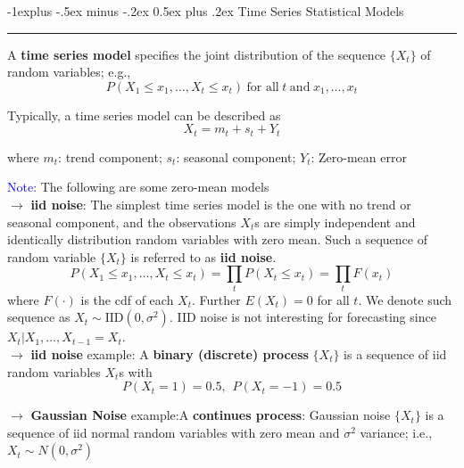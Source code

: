 \documentclass[letterpaper, 10.5pt,landscape]{article}
\makeatletter
\renewcommand{\subsection}{\@startsection{subsection}{2}{0mm}%
                                {-1explus -.5ex minus -.2ex}%
                                {0.5ex plus .2ex}%
                                {\normalfont\normalsize\bfseries}}
\makeatother
\begin{document}
\begin{multicols*}{3}
\subsection{Time Series Statistical Models} {\color{teal}\hrule height 0.5pt} \smallskip

A \textbf{time series model} specifies the joint distribution of the sequence $\{X_{t} \}$ of random variables; e.g., 
\vspace{-3pt}
\[P\left(X_{1} \leq x_{1}, \ldots, X_{t} \leq x_{t}\right) \hspace{3pt} \text{for all} \hspace{3pt} t \hspace{3pt} \text{and} \hspace{3pt} x_{1},\ldots, x_{t} \]

Typically, a time series model can be described as 
\vspace{-3pt}
\[X_{t} = m_{t} + s_{t} + Y_{t} \]

where $m_{t}$: trend component; $s_{t}$: seasonal component; $Y_{t}$: Zero-mean error 

\vspace{3pt}
\textcolor{blue}{Note:} The following are some zero-mean models \\

$\rightarrow$ \textbf{iid noise}: The simplest time series model is the one with no trend or seasonal component, and the observations $X_{t}$s are simply independent and identically distribution random variables with zero mean. Such a sequence of random variable $\{X_{t}\}$ is referred to as \textbf{iid noise}.
\vspace{-3pt}
\[P\left(X_{1} \leq x_{1}, \ldots, X_{t} \leq x_{t} \right) = \prod_{t} P \left(X_{t} \leq x_{t}\right) = \prod_{t} F(x_{t})\] where $F(\cdot)$ is the cdf of each $X_{t}$. Further $E(X_{t}) = 0$ for all $t$. We denote such sequence as $X_{t} \sim \text{IID}(0, \sigma^{2})$. IID noise is not interesting for forecasting since $X_{t}|X_{1}, \ldots, X_{t-1} = X_{t}$. \\

$\rightarrow$ \textbf{iid noise} example: A \textbf{binary (discrete) process} $\{X_{t} \}$ is a sequence of iid random variables $X_{t}$s with 
\vspace{-3pt}
\[P(X_{t} = 1) = 0.5, \hspace{5pt} P(X_{t} = -1) = 0.5 \]

\vspace{3pt}
$\rightarrow$ \textbf{Gaussian Noise} example:A \textbf{continues process}: Gaussian noise $\{X_{t}\}$ is a sequence of iid normal random variables with zero mean and $\sigma^{2}$ variance; i.e., \(X_{t} \sim N (0, \sigma^{2})\) \\



\end{multicols*}
\end{document}
